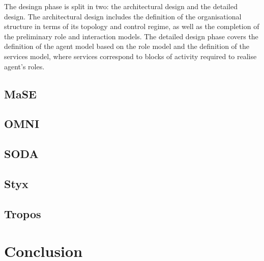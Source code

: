 \documentclass{article}
\begin{document}
The desingn phase is split in two: the architectural design and the detailed
design. The architectural design includes the definition of the organisational
structure in terms of its topology and control regime, as well as the
completion of the preliminary role and interaction models. The detailed design
phase covers the definition of the agent model based on the role model and the
definition of the services model, where services correspond to blocks of
activity required to realise agent's roles.

\cite{BlakeG05}
\cite{conf/aose/WooldridgeC00}

\subsection{MaSE}
\subsection{OMNI}
\cite{journals/aamas/Vazquez-SalcedaDD05}
\subsection{SODA}
\subsection{Styx}
\subsection{Tropos}
\section{Conclusion}



\end{document}

